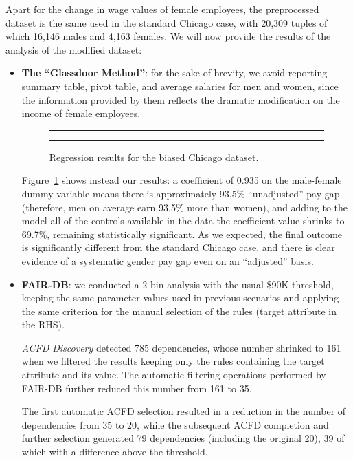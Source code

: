 Apart for the change in wage values of female employees, the preprocessed dataset is the same used in the standard Chicago case, with 20,309 tuples of which 16,146 males and 4,163 females. We will now provide the results of the analysis of the modified dataset:
\begin{itemize}
\item \textbf{The ``Glassdoor Method''}: for the sake of brevity, we avoid reporting summary table, pivot table, and average salaries for men and women, since the information provided by them reflects the dramatic modification on the income of female employees.

\begin{figure}[t!]
\centering
\noindent\rule{\linewidth}{0.4pt}\par
\noindent\rule{\linewidth}{0.4pt}
\caption{Regression results for the biased Chicago dataset.}
\label{fig:chicago_biased_glassdoor}
\end{figure}

Figure~\ref{fig:chicago_biased_glassdoor} shows instead our results: a coefficient of 0.935 on the male-female dummy variable means there is approximately 93.5\% ``unadjusted'' pay gap (therefore, men on average earn 93.5\% more than women), and adding to the model all of the controls available in the data the coefficient value shrinks to 69.7\%, remaining statistically significant. As we expected, the final outcome is significantly different from the standard Chicago case, and there is clear evidence of a systematic gender pay gap even on an ``adjusted'' basis.
\item \textbf{FAIR-DB}: we conducted a 2-bin analysis with the usual \$90K threshold, keeping the same parameter values used in previous scenarios and applying the same criterion for the manual selection of the rules (target attribute in the RHS).

\textit{ACFD Discovery} detected 785 dependencies, whose number shrinked to 161 when we filtered the results keeping only the rules containing the target attribute and its value. The automatic filtering operations performed by FAIR-DB further reduced this number from 161 to 35.

The first automatic ACFD selection resulted in a reduction in the number of dependencies from 35 to 20, while the subsequent ACFD completion and further selection generated 79 dependencies (including the original 20), 39 of which with a difference above the threshold.


\end{itemize}
